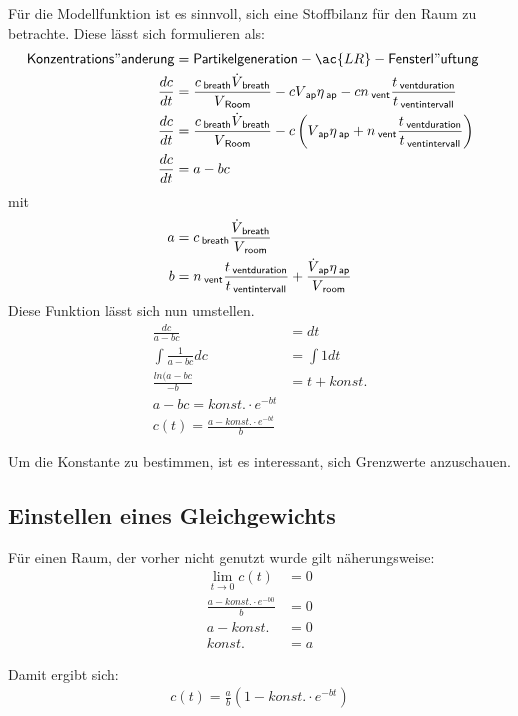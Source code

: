 \documentclass[12pt,a4paper,bibtotocnumbered,liststotocnumbered]{scrreprt}
\begin{document}
Für die Modellfunktion ist es sinnvoll, sich eine Stoffbilanz für den Raum zu betrachte. Diese lässt sich formulieren als:
\begin{align}
\mathsf{Konzentrations"anderung} &=   \mathsf{Partikelgeneration} -  \ac{LR} - \mathsf{Fensterl"uftung}\\
\frac{dc}{dt} &= \frac{c\tief{breath}\dot{V}\tief{breath}}{V\tief{Room}} - c V\tief{ap} \eta\tief{ap} - c n\tief{vent} \frac{t\tief{ventduration}}{t\tief{ventintervall}}\\
\frac{dc}{dt} &= \frac{c\tief{breath}\dot{V}\tief{breath}}{V\tief{Room}}  - c \left(V\tief{ap} \eta\tief{ap} +n\tief{vent} \frac{t\tief{ventduration}}{t\tief{ventintervall}} \right) &\\
\frac{dc}{dt} &= a - b c
\end{align}
mit
\begin{align}
a &= c_{\: \mathsf{breath}} \frac{\dot{V}_{\: \mathsf{breath}}}{V_{\: \mathsf{room}}}\\
\label{Equ.: konst b}
b &= n_{\: \mathsf{vent}} \frac{t_{\: \mathsf{ventduration}}}{t_{\: \mathsf{ventintervall}}} +\frac{\dot{V}_{\: \mathsf{ap}}  \eta_{\: \mathsf{ap}}}{V_{\: \mathsf{room}}}
\end{align}
Diese Funktion lässt sich nun umstellen.
\begin{align}
\frac{dc}{a - b c} &= dt\\
\int \frac{1}{a - b c} dc &=\int 1 dt\\
\frac{ln(a - b c}{-b} &=t + konst.\\
a- b c = konst. \cdot e^{-bt}\\
c(t) = \frac{a - konst. \cdot e^{-bt}}{b}
\end{align}



Um die Konstante zu bestimmen, ist es interessant, sich Grenzwerte anzuschauen.\\

\subsection{Einstellen eines Gleichgewichts}
Für einen Raum, der vorher nicht genutzt wurde gilt näherungsweise:
\begin{align}
\lim \limits_{t \to 0} c(t) & = 0\\
 \frac{a - konst. \cdot e^{-b0}}{b} &= 0\\
a - konst. &= 0\\
konst. &= a
\end{align}

Damit ergibt sich:
\begin{align}
c(t) = \frac{a}{b}(1 - konst. \cdot e^{-bt})
\end{align}
\end{document}
